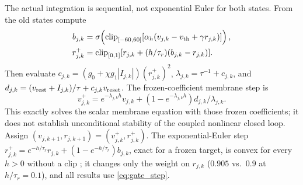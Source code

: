 \documentclass[letterpaper, 10 pt, conference]{ieeeconf}
\newcommand{\clip}{\operatorname{clip}}
\begin{document}
The actual integration is sequential, not exponential Euler for both
states. From the old states compute
\begin{align}
 b_{j,k}&=\sigma\!\left(\clip_{[-60,60]}
       [\alpha_h(v_{j,k}-v_{\rm th}+\gamma r_{j,k})]\right),\\
 r_{j,k}^{+}&=\clip_{[0,1]}
       [r_{j,k}+(h/\tau_r)(b_{j,k}-r_{j,k})].
 \label{eq:gate_step}
\end{align}
Then evaluate $c_{j,k}=(g_0+\chi g_1|I_{j,k}|)(r_{j,k}^{+})^2$,
$\lambda_{j,k}=\tau^{-1}+c_{j,k}$, and
$d_{j,k}=(v_{\rm rest}+I_{j,k})/\tau+c_{j,k}v_{\rm reset}$. The
frozen-coefficient membrane step is
\begin{equation}
 v_{j,k}^{+}=e^{-\lambda_{j,k}h}v_{j,k}
       +(1-e^{-\lambda_{j,k}h})d_{j,k}/\lambda_{j,k}.
 \label{eq:mem_step}
\end{equation}
This exactly solves the scalar membrane equation with those frozen
coefficients; it does not establish unconditional stability of the coupled
nonlinear closed loop. Assign $(v_{j,k+1},r_{j,k+1})=(v_{j,k}^{+},r_{j,k}^{+})$.
The exponential-Euler step
$r_{j,k}^{+}=e^{-h/\tau_r}r_{j,k}+(1-e^{-h/\tau_r})b_{j,k}$, exact for a
frozen target, is convex for every $h>0$ without a clip
\cite{hochbruck2010exponential}; it changes only the weight on $r_{j,k}$
($0.905$ vs.\ $0.9$ at $h/\tau_r=0.1$), and all results use
\eqref{eq:gate_step}.
\end{document}
